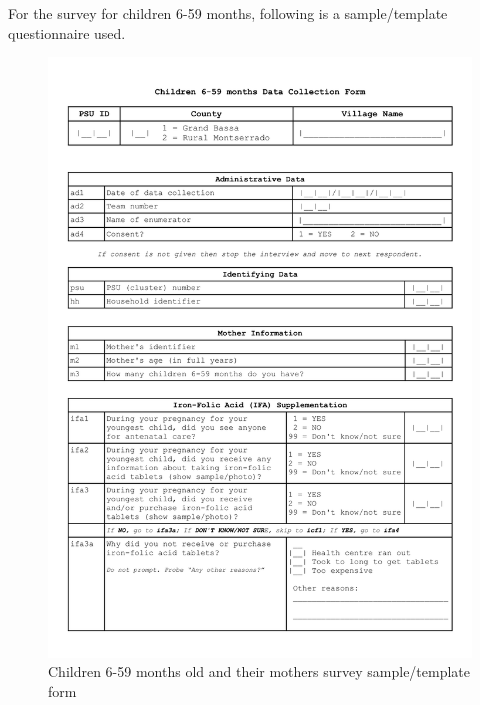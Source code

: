 \documentclass[12pt,a4paper]{article}
\begin{document}
For the survey for children 6-59 months, following is a sample/template questionnaire used.

\begin{figure}[H]

{\centering \includegraphics[width=0.9\linewidth]{forms/childForm1} 

}

\caption{Children 6-59 months old and their mothers survey sample/template form}\label{fig:childform1}
\end{figure}
\end{document}
